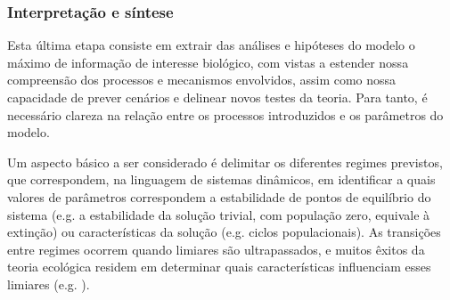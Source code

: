 \documentclass[12pt]{extarticle}
\begin{document}
\subsubsection{Interpretação e síntese}



Esta última etapa consiste em extrair das análises e hipóteses do modelo o
máximo de informação de interesse biológico, com vistas a estender nossa
compreensão dos processos e mecanismos envolvidos, assim como nossa capacidade
de prever cenários e delinear novos testes da teoria. Para tanto, é necessário
clareza na relação entre os processos introduzidos e os parâmetros do modelo.


Um aspecto básico a ser considerado é delimitar os diferentes regimes
previstos, que correspondem, na linguagem de sistemas dinâmicos, em
identificar a quais valores de parâmetros correspondem a estabilidade de
pontos de equilíbrio do sistema (e.g. a estabilidade da solução trivial, com
população zero, equivale à extinção) ou características da solução (e.g.
ciclos populacionais). As transições entre regimes ocorrem quando limiares são
ultrapassados, e muitos êxitos da teoria ecológica residem em determinar quais
características influenciam esses limiares (e.g. \citet{hanski2000,
fussmann2000}).
\end{document}
